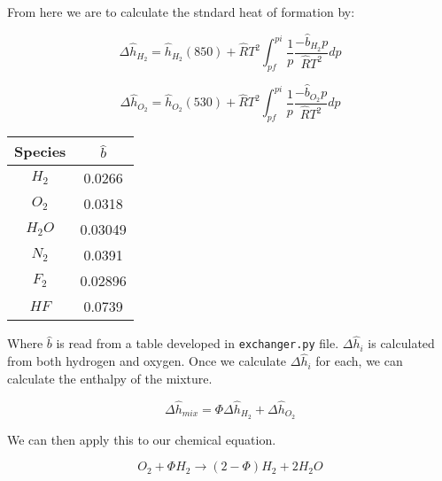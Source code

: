 \documentclass[12pt, Times New Roman]{article}
\begin{document}
    \vspace*{6pt}

    From here we are to calculate the stndard heat of formation by:
    
    \begin{equation}
        \Delta \hat{h}_{H_{2}} = \hat{h}_{H_{2}}(850) + \hat{R}T^{2}\int^{pi}_{pf} \frac{1}{p} \frac{-\hat{b}_{H_{2}}p}{\hat{R}T^{2}} dp
    \end{equation}

    \vspace*{6pt}

    \begin{equation}
        \Delta \hat{h}_{O_{2}} = \hat{h}_{O_{2}}(530) + \hat{R}T^{2}\int^{pi}_{pf} \frac{1}{p} \frac{-\hat{b}_{O_{2}}p}{\hat{R}T^{2}} dp
    \end{equation}

    \begin{center}
        \begin{tabular}{|c|c|}
            \hline
            Species & $\hat{b}$ \\
            \hline
            $H_{2}$ & 0.0266 \\
            \hline
            $O_{2}$ & 0.0318 \\
            \hline
            $H_{2}O$ & 0.03049 \\
            \hline
            $N_{2}$ & 0.0391 \\
            \hline
            $F_{2}$ & 0.02896 \\
            \hline
            $HF$ & 0.0739 \\
            \hline
        \end{tabular}
    \end{center}
    
    Where $\hat{b}$ is read from a table developed in \verb|exchanger.py| file. $\Delta \hat{h}_{i}$ is calculated from both 
    hydrogen and oxygen. Once we calculate $\Delta \hat{h}_{i}$ for each, we can calculate the enthalpy of the mixture.

    \begin{equation}
        \Delta \hat{h}_{mix} = \Phi \Delta \hat{h}_{H_{2}} + \Delta \hat{h}_{O_{2}}
    \end{equation}
    
    We can then apply this to our chemical equation.

    \begin{equation}
        O_{2} + \Phi H_{2} \rightarrow (2-\Phi)H_{2} +2H_{2}O
    \end{equation}
\end{document}
